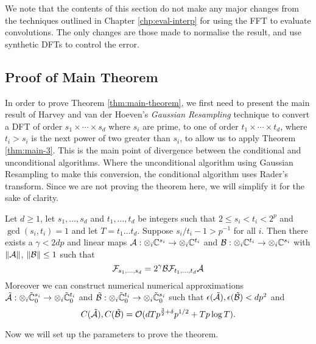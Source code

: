 We note that the contents of this section do not make any major changes from the techniques outlined in Chapter \ref{chp:eval-interp} for using the FFT to evaluate convolutions. The only changes are those made to normalise the result, and use synthetic DFTs to control the error. 

\subsection{Proof of Main Theorem}%
\label{sub:proof-of-main-theorem}

In order to prove Theorem \ref{thm:main-theorem}, we first need to present the main result of Harvey and van der Hoeven's \emph{Gaussian Resampling} technique to convert a DFT of order $s_1 \times \cdots \times s_d$ where $s_i$ are prime, to one of order $t_1 \times \cdots \times t_d$, where $t_i > s_i$ is the next power of two greater than $s_i$, to allow us to apply Theorem \ref{thm:main-3}. This is the main point of divergence between the conditional and unconditional algorithms. Where the unconditional algorithm using Gaussian Resampling to make this conversion, the conditional algorithm uses Rader's transform. Since we are not proving the theorem here, we will simplify it for the sake of clarity.

\begin{theorem}\label{thm:gaussian}
    Let $d \geq 1$, let $s_1, \ldots, s_d$ and $t_1, \ldots, t_d$ be integers such that $2 \leq s_i < t_i < 2^p$ and $\gcd(s_i, t_i) = 1$ and let $T = t_1\ldots t_d$. Suppose $s_i/t_i - 1 > p^{-1}$ for all $i$. Then there exists a $\gamma < 2dp$ and linear maps $\mathcal A: \otimes_i {\mathbb C}^{s_i} \to \otimes_i {\mathbb C}^{t_i}$ and $\mathcal B: \otimes_i {\mathbb C}^{t_i} \to \otimes_i {\mathbb C}^{s_i}$ with $\|\mathcal A\|$, $\|\mathcal B\| \leq 1$ such that
    \[
        \mathcal F_{s_1, \ldots, s_d} = 2^\gamma \mathcal B \mathcal F_{t_1, \ldots, t_d} \mathcal A
    \]
    Moreover we can construct numerical numerical approximations $\tilde{\mathcal A}: \otimes_i \tilde{{\mathbb C}}^{s_i}_0 \to \otimes_i \tilde{{\mathbb C}}^{t_i}_0$ and $\tilde{\mathcal B}: \otimes_i \tilde{{\mathbb C}}^{t_i}_0 \to \otimes_i \tilde{{\mathbb C}}^{s_i}_0$  such that $\epsilon(\tilde{\mathcal A}), \epsilon(\tilde{\mathcal B}) < dp^2$ and
    \[
        C(\tilde{\mathcal A}), C(\tilde{\mathcal B}) = \mathcal O(dTp^{{\frac{3}{2}} + \delta}p^{1/2} + Tp\log T).
    \]
\end{theorem}

\medskip

Now we will set up the parameters to prove the theorem.

